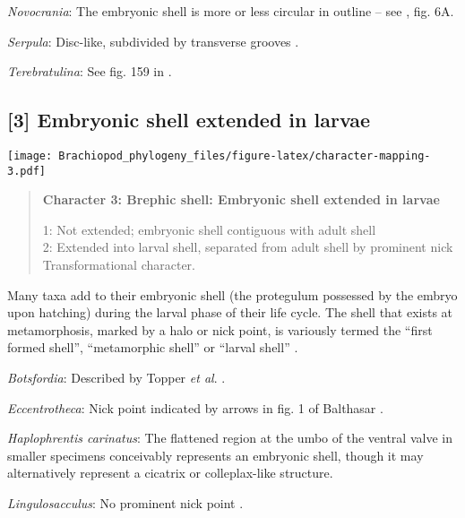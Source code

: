 \documentclass[openany]{book}
\theoremstyle{definition}
\theoremstyle{definition}
\theoremstyle{definition}
\theoremstyle{remark}
\begin{document}
\hypertarget{Novocrania-coding-2}{}
\emph{Novocrania}: The embryonic shell is more or less circular in
outline -- see \citet{Freeman1999Changesin}, fig. 6A.

\hypertarget{Serpula-coding-2}{}
\emph{Serpula}: Disc-like, subdivided by transverse grooves
\citep{Wanninger2002C}.

\hypertarget{Terebratulina-coding-2}{}
\emph{Terebratulina}: See fig. 159 in \citet{Williams1997Introduction}.

\subsection*{{[}3{]} Embryonic shell extended in
larvae}\label{embryonic-shell-extended-in-larvae}

\texttt{[image: Brachiopod\_phylogeny\_files/figure-latex/character-mapping-3.pdf]}

\begin{quote}
\textbf{Character 3: Brephic shell: Embryonic shell extended in larvae}

1: Not extended; embryonic shell contiguous with adult shell\\
2: Extended into larval shell, separated from adult shell by prominent
nick\\
Transformational character.
\end{quote}

Many taxa add to their embryonic shell (the protegulum possessed by the
embryo upon hatching) during the larval phase of their life cycle. The
shell that exists at metamorphosis, marked by a halo or nick point, is
variously termed the ``first formed shell'', ``metamorphic shell'' or
``larval shell'' \citep{Bassett2017Earliestontogeny}.

\hypertarget{Botsfordia-coding-3}{}
\emph{Botsfordia}: Described by Topper \emph{et al}.
\citeyearpar{Topper2013Reappraisalof}.

\hypertarget{Eccentrotheca-coding-3}{}
\emph{Eccentrotheca}: Nick point indicated by arrows in fig. 1 of
Balthasar \citeyearpar{Balthasar2009Thebrachiopod}.

\hypertarget{Haplophrentis_carinatus-coding-3}{}
\emph{Haplophrentis carinatus}: The flattened region at the umbo of the
ventral valve in smaller specimens conceivably represents an embryonic
shell, though it may alternatively represent a cicatrix or
colleplax-like structure.

\hypertarget{Lingulosacculus-coding-3}{}
\emph{Lingulosacculus}: No prominent nick point
\citep{Holmer1997EarlyCambrian, Li2004}.
\end{document}
